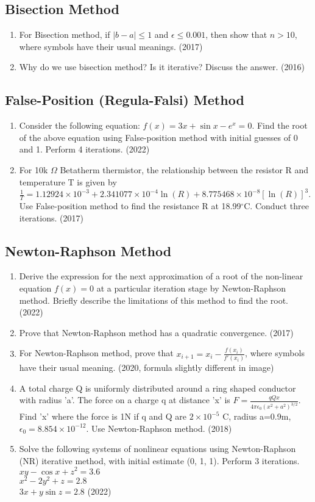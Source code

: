 \documentclass[12pt, a4paper]{article}
\begin{document}
	\subsection{Bisection Method}
	\begin{enumerate}
		\item For Bisection method, if $|b-a| \le 1$ and $\epsilon \le 0.001$, then show that $n > 10$, where symbols have their usual meanings. (2017)
		\item Why do we use bisection method? Is it iterative? Discuss the answer. (2016)
	\end{enumerate}
	
	\subsection{False-Position (Regula-Falsi) Method}
	\begin{enumerate}
		\item Consider the following equation: $f(x) = 3x + \sin x - e^x = 0$. Find the root of the above equation using False-position method with initial guesses of 0 and 1. Perform 4 iterations. (2022)
		\item For 10k $\Omega$ Betatherm thermistor, the relationship between the resistor R and temperature T is given by $\frac{1}{T} = 1.12924 \times 10^{-3} + 2.341077 \times 10^{-4} \ln(R) + 8.775468 \times 10^{-8} [\ln(R)]^3$. Use False-position method to find the resistance R at 18.99$^{\circ}$C. Conduct three iterations. (2017)
	\end{enumerate}
	
	\subsection{Newton-Raphson Method}
	\begin{enumerate}
		\item Derive the expression for the next approximation of a root of the non-linear equation $f(x)=0$ at a particular iteration stage by Newton-Raphson method. Briefly describe the limitations of this method to find the root. (2022)
		\item Prove that Newton-Raphson method has a quadratic convergence. (2017)
		\item For Newton-Raphson method, prove that $x_{i+1} = x_i - \frac{f(x_i)}{f'(x_i)}$, where symbols have their usual meaning. (2020, formula slightly different in image)
		\item A total charge Q is uniformly distributed around a ring shaped conductor with radius 'a'. The force on a charge q at distance 'x' is $F = \frac{qQx}{4\pi\epsilon_0(x^2+a^2)^{3/2}}$. Find 'x' where the force is 1N if q and Q are $2 \times 10^{-5}$ C, radius a=0.9m, $\epsilon_0=8.854 \times 10^{-12}$. Use Newton-Raphson method. (2018)
		\item Solve the following systems of nonlinear equations using Newton-Raphson (NR) iterative method, with initial estimate (0, 1, 1). Perform 3 iterations. 
		$xy - \cos x + z^2 = 3.6$ \\
		$x^2 - 2y^2 + z = 2.8$ \\
		$3x + y \sin z = 2.8$ (2022)
	\end{enumerate}
	
\end{document}
